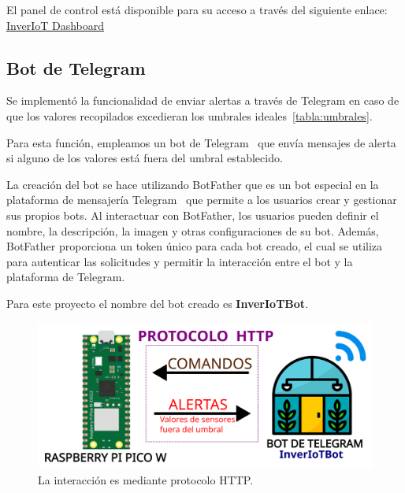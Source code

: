 El panel de control está disponible para su acceso a través del siguiente enlace: \href{http://www.inveriot.com}{InverIoT Dashboard}




\subsection{Bot de Telegram}\label{proyecto:BotTelegram}

Se implementó la funcionalidad de enviar alertas a través de Telegram en caso de que los valores recopilados excedieran los umbrales ideales~\ref{tabla:umbrales}.

Para esta función, empleamos un bot de Telegram~\cite{misc:Telegram_bots} que envía mensajes de alerta si alguno de los valores está fuera del umbral establecido. 

La creación del bot se hace utilizando BotFather\cite{misc:BotFather} que es un bot especial en la plataforma de mensajería Telegram~\cite{misc:Telegram} que permite a los usuarios crear y gestionar sus propios bots. Al interactuar con BotFather, los usuarios pueden definir el nombre, la descripción, la imagen y otras configuraciones de su bot. Además, BotFather proporciona un token único para cada bot creado, el cual se utiliza para autenticar las solicitudes y permitir la interacción entre el bot y la plataforma de Telegram.

Para este proyecto el nombre del bot creado es \textbf{InverIoTBot}.

\begin{figure}[h]
	\centering
	\includegraphics[width=1\textwidth]{img/diagramas/telegramBot.png}
	\caption{La interacción es mediante protocolo HTTP.} \label{Img:telegramBot}
\end{figure}

